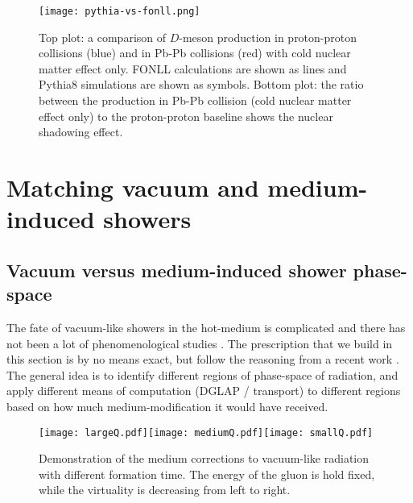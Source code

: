 \begin{figure}
\centering
\texttt{[image: pythia-vs-fonll.png]}
\caption{Top plot: a comparison of $D$-meson production in proton-proton collisions (blue) and in Pb-Pb collisions (red) with cold nuclear matter effect only. FONLL calculations are shown as lines and Pythia8 simulations are shown as symbols. Bottom plot: the ratio between the production in Pb-Pb collision (cold nuclear matter effect only) to the proton-proton baseline shows the nuclear shadowing effect.}
\label{fig:pythia-fonll}
\end{figure}

\section{Matching vacuum and medium-induced showers}
\subsection{Vacuum versus medium-induced shower phase-space}
\label{section:match}
The fate of vacuum-like showers in the hot-medium is complicated and there has not been a lot of phenomenological studies \cite{Cao:2017zih,PhysRevLett.120.232001,PhysRevLett.120.232001,Caucal:2018ofz}.
The prescription that we build in this section is by no means exact, but follow the reasoning from a recent work \cite{PhysRevLett.120.232001}.
The general idea is to identify different regions of phase-space of radiation, and apply different means of computation (DGLAP / transport) to different regions based on how much medium-modification it would have received.

\begin{figure}
\texttt{[image: largeQ.pdf]}\texttt{[image: mediumQ.pdf]}\texttt{[image: smallQ.pdf]}
\caption{Demonstration of the medium corrections to vacuum-like radiation with different formation time. The energy of the gluon is hold fixed, while the virtuality is decreasing from left to right.}
\label{fig:vac-med-interface}
\end{figure}

